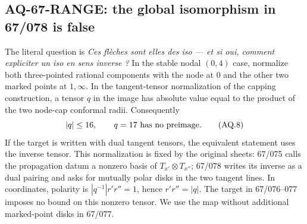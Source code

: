 \subsection{AQ-67-RANGE: the global isomorphism in 67/078 is false}
The literal question is \emph{Ces fl\`eches sont elles
des iso --- et si oui, comment expliciter un iso en
sens inverse ?} In the stable nodal $(0,4)$ case,
normalize both three-pointed rational components with
the node at $0$ and the other two marked points at
$1,\infty$. In the tangent-tensor normalization of
the capping construction, a tensor $q$ in the image
has absolute value equal to the product of the two
node-cap conformal radii. Consequently
\[
 |q|\leq16,\qquad q=17\ \hbox{has no preimage}.                  \tag{AQ.8}
\]
If the target is written with dual tangent tensors,
the equivalent statement uses the inverse tensor.
This normalization is fixed by the original sheets:
67/075 calls the propagation datum a nonzero basis of
$T_{x'}\otimes T_{x''}$; 67/078 writes its inverse
as a dual pairing and asks for mutually polar disks
in the two tangent lines. In coordinates, polarity
is $|q^{-1}|r'r''=1$, hence $r'r''=|q|$.
The target in 67/076--077 imposes no bound on this
nonzero tensor. We use the map without additional
marked-point disks in 67/077.

